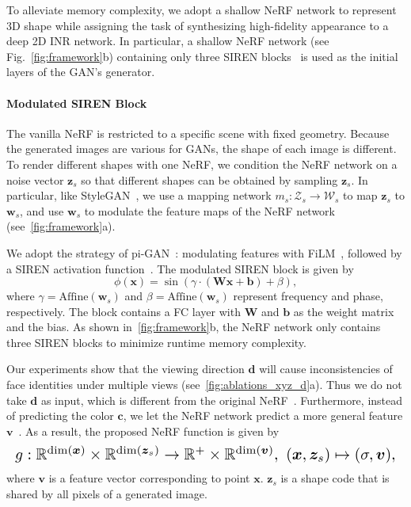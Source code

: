 \documentclass[10pt,twocolumn,letterpaper]{article}
\def\vb{{\bm{b}}}
\def\vc{{\bm{c}}}
\def\vd{{\bm{d}}}
\def\vv{{\bm{v}}}
\def\vw{{\bm{w}}}
\def\vx{{\bm{x}}}
\def\vz{{\bm{z}}}
\def\mW{{\bm{W}}}
\newcommand{\R}{\mathbb{R}}
\begin{document}
To alleviate memory complexity, we adopt a shallow NeRF network to represent 3D shape while assigning the task of synthesizing high-fidelity appearance to a deep 2D INR network. In particular, a shallow NeRF network (see Fig.~\ref{fig:framework}b) containing only three SIREN blocks~\cite{sitzmann2020Implicita} is used as the initial layers of the GAN's generator.



\paragraph{Modulated SIREN Block}
The vanilla NeRF is restricted to a specific scene with fixed geometry. Because the generated images are various for GANs, the shape of each image is different. To render different shapes with one NeRF, we condition the NeRF network on a noise vector $\vz_s$ so that different shapes can be obtained by sampling  $\vz_s$. In particular, like StyleGAN~\cite{karras2019StyleBased}, we use a mapping network $m_s: \mathcal{Z}_s \rightarrow \mathcal{W}_s$ to map $\vz_s$ to $\vw_s$, and use $\vw_s$ to modulate the feature maps of the NeRF network (see~\cref{fig:framework}a).

We adopt the strategy of pi-GAN~\cite{chan2021piGAN}: modulating features with FiLM~\cite{perez2017FiLM,48757}, followed by a SIREN activation function~\cite{sitzmann2020Implicita}. The modulated SIREN block is given by
\begin{equation}
  \phi\left(\vx \right)=\sin \left(\gamma \cdot (\mW\vx+\vb) + \beta \right),
\end{equation}
where $\gamma=\mathrm{Affine}(\vw_s)$ and $\beta=\mathrm{Affine}(\vw_s)$ represent frequency and phase, respectively. The block contains a FC layer with $\mW$ and $\vb$ as the weight matrix and the bias. As shown in~\cref{fig:framework}b, the NeRF network only contains three SIREN blocks to minimize runtime memory complexity.

Our experiments show that the viewing direction $\vd$ will cause inconsistencies of face identities under multiple views (see~\cref{fig:ablations_xyz_d}a). Thus we do not take $\vd$ as input, which is different from the original NeRF~\cite{mildenhall2020NeRF}. Furthermore, instead of predicting the color $\vc$, we let the NeRF network predict a more general feature $\vv$~\cite{niemeyer2021GIRAFFE}. As a result, the proposed NeRF function is given by
\begin{equation}
\resizebox{\hsize}{!}{$
      g: \R^{\mathrm{dim}(\vx)} \times \R^{\mathrm{dim}(\vz_s)}  \rightarrow \R^+ \times \R^{\mathrm{dim}(\vv)}, \ (\vx, \vz_s)                                               \mapsto(\sigma, \vv),
    $}
\label{equ:nerf_feature}
\end{equation}
where $\vv$ is a feature vector corresponding to point $\vx$. $\vz_s$ is a shape code that is shared by all pixels of a generated image.
\end{document}
